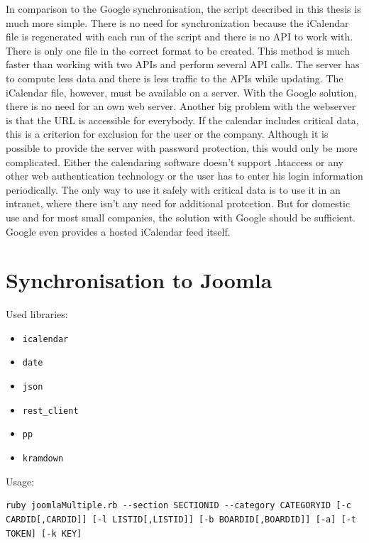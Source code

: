 In comparison to the Google synchronisation, the script described in this thesis is much more simple. There is no need for synchronization because the iCalendar file is regenerated with each run of the script and there is no API to work with. There is only one file in the correct format to be created. This method is much faster than working with two APIs and perform several API calls. The server has to compute less data and there is less traffic to the APIs while updating. The iCalendar file, however, must be available on a server. With the Google solution, there is no need for an own web server. Another big problem with the webserver is that the URL is accessible for everybody. If the calendar includes critical data, this is a criterion for exclusion for the user or the company. Although it is possible to provide the server with password protection, this would only be more complicated. Either the calendaring software doesn't support .htaccess or any other web authentication technology or the user has to enter his login information periodically. The only way to use it safely with critical data is to use it in an intranet, where there isn't any need for additional protcetion. But for domestic use and for most small companies, the solution with Google should be sufficient. Google even provides a hosted iCalendar feed itself. 

\section{Synchronisation to Joomla}

Used libraries:
\begin{itemize}
	\item \texttt{icalendar}
	\item \texttt{date}
	\item \texttt{json}
	\item \texttt{rest\_client}
	\item \texttt{pp}
	\item \texttt{kramdown}
\end{itemize}

Usage:
\begin{lstlisting}[aboveskip=1\baselineskip, style=bash, caption=\texttt{joomlaMultiple.rb} usage., label=listing028]
ruby joomlaMultiple.rb --section SECTIONID --category CATEGORYID [-c CARDID[,CARDID]] [-l LISTID[,LISTID]] [-b BOARDID[,BOARDID]] [-a] [-t TOKEN] [-k KEY]
\end{lstlisting}

